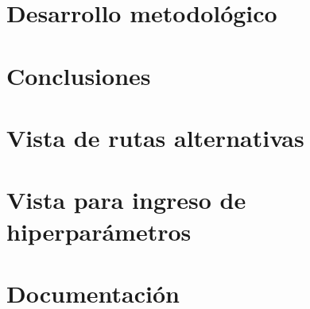 \documentclass[stu, 12pt, noextraspace, floatsintext]{apa7}
\begin{document}
\clearpage
\section{Desarrollo metodológico}


\clearpage
\section{Conclusiones}


\clearpage
\printbibliography[{heading=bibintoc}]
\thispagestyle{otherplain}

\appendix

\section{Vista de rutas alternativas}


\section{Vista para ingreso de hiperparámetros}


\section{Documentación}

\end{document}
